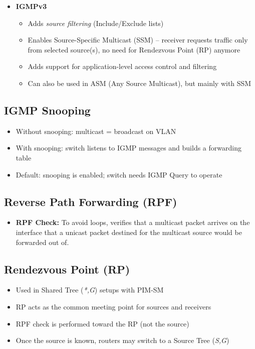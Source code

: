 \begin{multicols*}{5}
\begin{itemize}
			\item \textbf{IGMPv3}
			\begin{itemize}
				\item Adds \textit{source filtering} (Include/Exclude lists)
				\item Enables Source-Specific Multicast (SSM) – receiver requests traffic only from selected source(s), no need for Rendezvous Point (RP) anymore
				\item Adds support for application-level access control and filtering
				\item Can also be used in ASM (Any Source Multicast), but mainly with SSM
			\end{itemize}
		\end{itemize}
		
		\subsection{IGMP Snooping}
		\begin{itemize}
			\item Without snooping: multicast = broadcast on VLAN
			\item With snooping: switch listens to IGMP messages and builds a forwarding table
			\item Default: snooping is enabled; switch needs IGMP Query to operate
		\end{itemize}
		
		\subsection{Reverse Path Forwarding (RPF)}
		\begin{itemize}
			\item \textbf{RPF Check:} To avoid loops, verifies that a multicast packet arrives on the interface that a unicast packet destined for the multicast source would be forwarded out of. 
		\end{itemize}
		
		\subsection{Rendezvous Point (RP)}
		\begin{itemize}
			\item Used in Shared Tree (\textit{*,G}) setups with PIM-SM
			\item RP acts as the common meeting point for sources and receivers
			\item RPF check is performed toward the RP (not the source)
			\item Once the source is known, routers may switch to a Source Tree (\textit{S,G})
		\end{itemize}
		

\end{multicols*}
